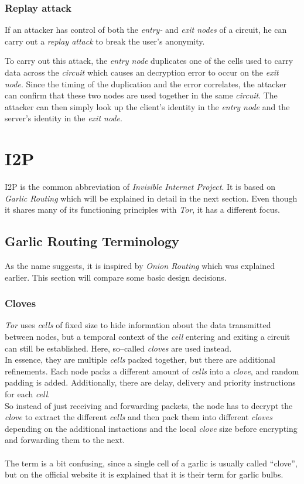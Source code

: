 \documentclass{sig-alternate}
\begin{document}
\subsubsection{Replay attack}
If an attacker has control of both the \emph{entry-} and \emph{exit nodes} of a circuit, he
can carry out a \emph{replay attack}\cite{pries2007} to break the user's anonymity.

To carry out this attack, the \emph{entry node} duplicates one of the cells used to carry data
across the \emph{circuit} which causes an decryption error to occur on the \emph{exit node}.
Since the timing of the duplication and the error correlates, the attacker can confirm that
these two nodes are used together in the same \emph{circuit}. The attacker can then simply
look up the client's identity in the \emph{entry node} and the server's identity in the
\emph{exit node}.

\section{I2P}
I2P is the common abbreviation of \emph{Invisible Internet Project}.
It is based on \emph{Garlic Routing} which will be explained in detail in the next section.
Even though it shares many of its functioning principles with \emph{Tor}, it has a different focus.

\subsection{Garlic Routing Terminology}
As the name suggests, it is inspired by \emph{Onion Routing} which was explained earlier.
This section will compare some basic design decisions.

\subsubsection{Cloves}
\emph{Tor} uses \emph{cells} of fixed size to hide information about the data transmitted between nodes, but a temporal context of the \emph{cell} entering and exiting a circuit can still be established.
Here, so--called \emph{cloves} are used instead.
\\
In essence, they are multiple \emph{cells} packed together, but there are additional refinements.
Each node packs a different amount of \emph{cells} into a \emph{clove}, and random padding is added.
Additionally, there are delay, delivery and priority instructions for each \emph{cell}.
\\
So instead of just receiving and forwarding packets, the node has to decrypt the \emph{clove} to extract the different \emph{cells} and then pack them into different \emph{cloves} depending on the additional instactions and the local \emph{clove} size before encrypting and forwarding them to the next\cite{zantout2011}.
\\
\\
The term is a bit confusing, since a single cell of a garlic is usually called ``clove'', but on the official website it is explained that it is their term for garlic bulbs\cite{garlic}.
\end{document}
